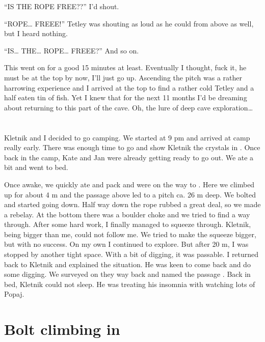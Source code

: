 ``IS THE ROPE FREE??'' I'd shout.

``ROPE\ldots{} FREEE!'' Tetley was shouting as loud as he could from
above as well, but I heard nothing.

``IS\ldots{} THE\ldots{} ROPE\ldots{} FREEE?'' And so on.

This went on for a good 15 minutes at least. Eventually I thought, fuck
it, he must be at the top by now, I'll just go up. Ascending the pitch
was a rather harrowing experience and I arrived at the top to find a
rather cold Tetley and a half eaten tin of fish. Yet I knew that for the
next 11 months I'd be dreaming about returning to this part of the cave.
Oh, the lure of deep cave exploration\ldots{}



\section{\texorpdfstring{}{Let na Drugi Svet}}

Kletnik and I decided to go camping. We started at 9 pm and arrived at
camp  really early. There was enough time to go and show
Kletnik the crystals in . Once back in the
camp, Kate and Jan were already getting ready to go out. We ate a bit
and went to bed.

Once awake, we quickly ate and pack and were on the way to
. Here we climbed up for about 4 m and the passage
above led to a pitch ca. 26 m deep. We bolted and started going down.
Half way down the rope rubbed a great deal, so we made a rebelay. At the
bottom there was a boulder choke and we tried to find a way through.
After some hard work, I finally managed to squeeze through. Kletnik,
being bigger than me, could not follow me. We tried to make the squeeze
bigger, but with no success. On my own I continued to explore. But after
20 m, I was stopped by another tight space. With a bit of digging, it
was passable. I returned back to Kletnik and explained the situation. He
was keen to come back and do some digging. We surveyed on they way back
and named the passage . Back in bed, Kletnik
could not sleep. He was treating his insomnia with watching lots of
Popaj.



\section{\texorpdfstring{Bolt climbing in }{Bolt climbing in Queen's bed Chamber}}

